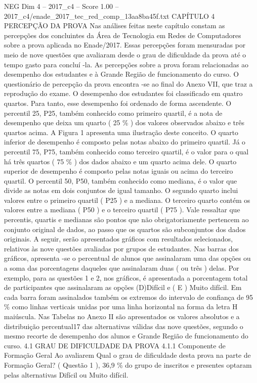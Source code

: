 \begin{textsample}{NEG Dim 4 – 2017\_c4 – Score 1.00 – 2017\_c4/enade\_2017\_tec\_red\_comp\_13aa8ba45f.txt}  \label{ex:f4_neg_128}
CAPÍTULO 4 PERCEPÇÃO DA PROVA Nas análises feitas neste capítulo constam as percepções dos concluintes da Área de Tecnologia em Redes de Computadores sobre a prova aplicada no Enade/2017.
Essas percepções foram mensuradas por meio de nove questões que avaliaram desde o grau de dificuldade da prova até o tempo gasto para concluí -la.
As percepções sobre a prova foram relacionadas ao desempenho dos estudantes e à Grande Região de funcionamento do curso.
O questionário de percepção da prova encontra -se ao final do Anexo VII, que traz a reprodução do exame.
O desempenho dos estudantes foi classificado em quatro quartos.
Para tanto, esse desempenho foi ordenado de forma ascendente.
O percentil 25, P25, também conhecido como primeiro quartil, é a nota de desempenho que deixa um quarto ( 25 \% ) dos valores observados abaixo e três quartos acima.
A Figura 1 apresenta uma ilustração deste conceito.
O quarto inferior de desempenho é composto pelas notas abaixo do primeiro quartil.
Já o percentil 75, P75, também conhecido como terceiro quartil, é o valor para o qual há três quartos ( 75 \% ) dos dados abaixo e um quarto acima dele.
O quarto superior de desempenho é composto pelas notas iguais ou acima do terceiro quartil.
O percentil 50, P50, também conhecido como mediana, é o valor que divide as notas em dois conjuntos de igual tamanho.
O segundo quarto inclui valores entre o primeiro quartil ( P25 ) e a mediana.
O terceiro quarto contém os valores entre a mediana ( P50 ) e o terceiro quartil ( P75 ).
Vale ressaltar que percentis, quartis e medianas são pontos que não obrigatoriamente pertencem ao conjunto original de dados, ao passo que os quartos são subconjuntos dos dados originais.
A seguir, serão apresentados gráficos com resultados selecionados, relativos às nove questões avaliadas por grupos de estudantes.
Nas barras dos gráficos, apresenta -se o percentual de alunos que assinalaram uma das opções ou a soma das porcentagens daqueles que assinalaram duas ( ou três ) delas.
Por exemplo, para as questões 1 e 2, nos gráficos, é apresentada a porcentagem total de participantes que assinalaram as opções (D)Difícil e ( E ) Muito difícil.
Em cada barra foram assinalados também os extremos do intervalo de confiança de 95 \% como linhas verticais unidas por uma linha horizontal na forma da letra H maiúscula.
Nas Tabelas no Anexo II são apresentados os valores absolutos e a distribuição percentual17 das alternativas válidas das nove questões, segundo o mesmo recorte de desempenho dos alunos e Grande Região de funcionamento do curso. 4.1 GRAU DE DIFICULDADE DA PROVA 4.1.1 Componente de Formação Geral Ao avaliarem Qual o grau de dificuldade desta prova na parte de Formação Geral? ( Questão 1 ), 36,9 \% do grupo de inscritos e presentes optaram pelas alternativas Difícil ou Muito difícil.

\end{textsample}

